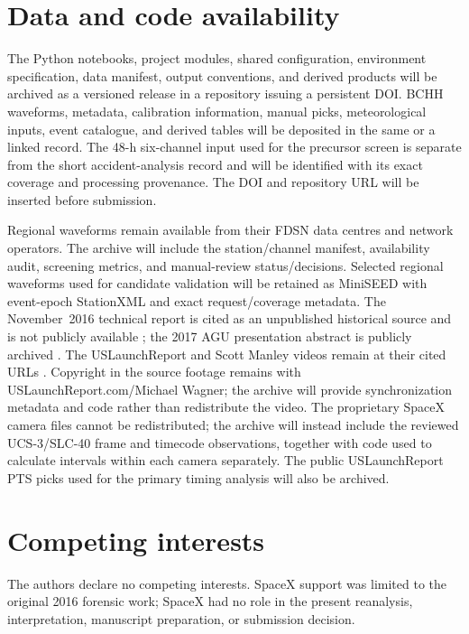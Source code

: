 \documentclass[]{seismica}
\begin{document}
\section*{Data and code availability}

The Python notebooks, project modules, shared configuration, environment
specification, data manifest, output conventions, and derived products will be
archived as a versioned release in a repository issuing a persistent DOI. BCHH
waveforms, metadata, calibration information, manual picks, meteorological
inputs, event catalogue, and derived tables will be deposited in the same or a
linked record. The 48-h six-channel input used for the precursor screen is
separate from the short accident-analysis record and will be identified with
its exact coverage and processing provenance. The DOI and repository URL will be inserted before submission.

Regional waveforms remain available from their FDSN data centres and network
operators. The archive will include the station/channel manifest, availability
audit, screening metrics, and manual-review status/decisions. Selected regional
waveforms used for candidate validation will be retained as MiniSEED with
event-epoch StationXML and exact request/coverage metadata. The November~2016
technical report is cited as an unpublished historical source and is not
publicly available \citep{thompson_mcnutt_fireball_2016}; the 2017 AGU
presentation abstract is publicly archived \citep{thompson_agu_falcon9_2017}. The USLaunchReport and
Scott Manley videos remain at their cited URLs
\citep{uslaunchreport_amos6_video_2016,manley_spacex_explosion_2016}. Copyright
in the source footage remains with USLaunchReport.com/Michael Wagner; the
archive will provide synchronization metadata and code rather than redistribute
the video. The proprietary SpaceX camera files cannot be redistributed; the archive
will instead include the reviewed UCS-3/SLC-40 frame and timecode observations,
together with code used to calculate intervals within each camera separately.
The public USLaunchReport PTS picks used for the primary timing analysis will
also be archived.


\section*{Competing interests}

The authors declare no competing interests. SpaceX support was limited to the
original 2016 forensic work; SpaceX had no role in the present reanalysis,
interpretation, manuscript preparation, or submission decision.


\end{document}
